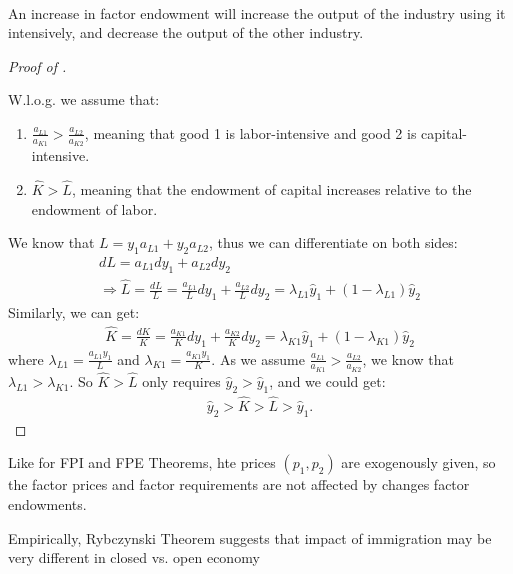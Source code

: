 \begin{theorem}\label{thm:Ryb}
    \

    An increase in factor endowment will increase the output of the industry using it intensively,
    and decrease the output of the other industry.
\end{theorem}

\begin{proof}[Proof of ]
    \

    W.l.o.g. we assume that:
    \begin{enumerate}
        \item $\frac{a_{L1}}{a_{K1}} > \frac{a_{L2}}{a_{K2}}$, meaning that good 1 is labor-intensive and good 2 is capital-intensive.
        \item $\hat{K} > \hat{L}$, meaning that the endowment of capital increases relative to the endowment of labor.
    \end{enumerate}
    We know that $L = y_1 a_{L1} + y_2 a_{L2}$, thus we can differentiate on both sides:
    \begin{gather*}
        d L = a_{L1} d y_1 + a_{L2} d y_2 \\
        \Rightarrow \hat{L} = \frac{d L}{L} = \frac{a_{L1}}{L} d y_1 + \frac{a_{L2}}{L} d y_2 = \lambda_{L1} \hat{y}_1 + (1-\lambda_{L1}) \hat{y}_2
    \end{gather*}
    Similarly, we can get:
    \begin{gather*}
        \hat{K} = \frac{d K}{K} = \frac{a_{K1}}{K} d y_1 + \frac{a_{K2}}{K} d y_2 = \lambda_{K1} \hat{y}_1 + (1-\lambda_{K1}) \hat{y}_2
    \end{gather*}
    where $\lambda_{L1} = \frac{a_{L1} y_1}{L}$ and $\lambda_{K1} = \frac{a_{K1} y_1}{K}$.
    As we assume $\frac{a_{L1}}{a_{K1}} > \frac{a_{L2}}{a_{K2}}$,  we know that $\lambda_{L1} > \lambda_{K1}$.
    So $\hat{K} > \hat{L}$ only requires $\hat{y}_2 > \hat{y}_1$, and we could get:
    \begin{gather*}
        \hat{y}_2 > \hat{K} > \hat{L} > \hat{y}_1.
    \end{gather*}
\end{proof}

Like for FPI and FPE Theorems, hte prices $(p_1, p_2)$ are exogenously given,
so the factor prices and factor requirements are not affected by changes factor endowments.

Empirically, Rybczynski Theorem suggests that impact of immigration
may be very different in closed vs. open economy

